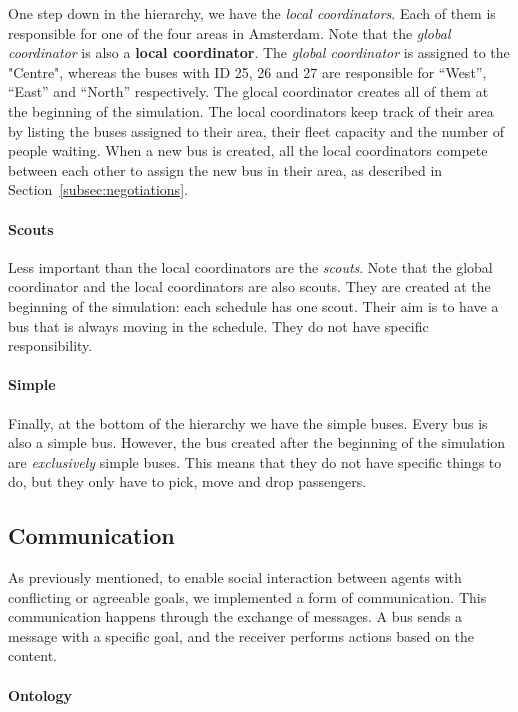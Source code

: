 One step down in the hierarchy, we have the \textit{local coordinators}. Each of them is responsible for one of the four areas in Amsterdam. Note that the \textit{global coordinator} is also a \textbf{local coordinator}. The \textit{global coordinator} is assigned to the "Centre", whereas the buses with ID 25, 26 and 27 are responsible for ``West'', ``East'' and ``North'' respectively. The glocal coordinator creates all of them at the beginning of the simulation. The local coordinators keep track of their area by listing the buses assigned to their area, their fleet capacity and the number of people waiting. When a new bus is created, all the local coordinators compete between each other to assign the new bus in their area, as described in Section~\ref{subsec:negotiations}.

\paragraph{Scouts}

Less important than the local coordinators are the \textit{scouts}. Note that the global coordinator and the local coordinators are also scouts. They are created at the beginning of the simulation: each schedule has one scout. Their aim is to have a bus that is always moving in the schedule. They do not have specific responsibility.

\paragraph{Simple}

Finally, at the bottom of the hierarchy we have the simple buses. Every bus is also a simple bus. However, the bus created after the beginning of the simulation are \textit{exclusively} simple buses. This means that they do not have specific things to do, but they only have to pick, move and drop passengers.

\subsection{Communication}

As previously mentioned, to enable social interaction between agents with conflicting or agreeable goals, we implemented a form of communication. This communication happens through the exchange of messages. A bus sends a message with a specific goal, and the receiver performs actions based on the content.

\paragraph{Ontology}

